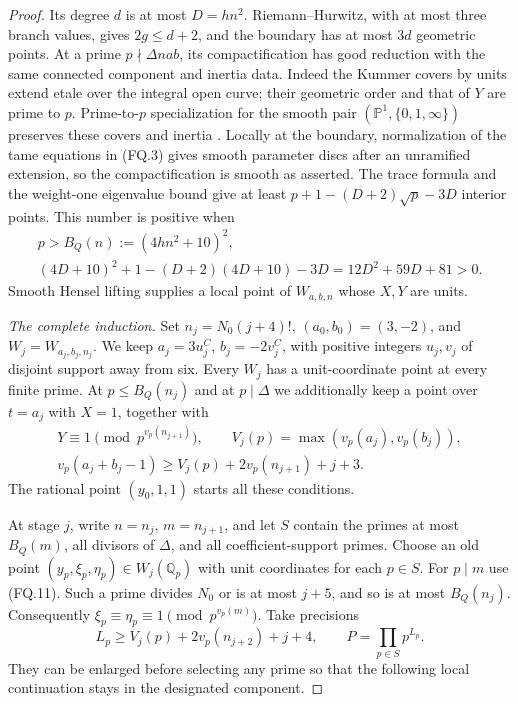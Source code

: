 \begin{proof}
Its degree \(d\) is at most \(D=hn^2\).
Riemann--Hurwitz, with at most three branch
values, gives \(2g\le d+2\), and the boundary
has at most \(3d\) geometric points.
At a prime \(p\nmid\Delta nab\), its
compactification has good reduction with the
same connected component and inertia data.
Indeed the Kummer covers by units extend
etale over the integral open curve; their
geometric order and that of \(Y\) are prime
to \(p\). Prime-to-\(p\) specialization for
the smooth pair \((\mathbb P^1,\{0,1,\infty\})\)
preserves these covers and inertia
\cite[Expos\'e XIII, Corollary 2.9,
\S2.10 and Lemma 2.11]{GhostSGA1}.
Locally at the boundary, normalization of the
tame equations in (FQ.3) gives smooth parameter
discs after an unramified extension, so the
compactification is smooth as asserted.
The trace formula and the weight-one eigenvalue
bound \cite[(1.5.1) and Theorem (1.6)]{GhostDeligneWeilI}
give at least
\(p+1-(D+2)\sqrt p-3D\) interior points.
This number is positive when
\[
 \begin{gathered}
 p>B_Q(n):=(4hn^2+10)^2,\\
 (4D+10)^2+1-(D+2)(4D+10)-3D
   =12D^2+59D+81>0.
 \end{gathered}
 \tag{FQ.10}
\]
Smooth Hensel lifting supplies a local point
of \(W_{a,b,n}\) whose \(X,Y\) are units.

\emph{The complete induction.}
Set \(n_j=N_0(j+4)!\), \((a_0,b_0)=(3,-2)\),
and \(W_j=W_{a_j,b_j,n_j}\).
We keep \(a_j=3u_j^C\), \(b_j=-2v_j^C\),
with positive integers \(u_j,v_j\) of disjoint
support away from six. Every \(W_j\) has a
unit-coordinate point at every finite prime.
At \(p\le B_Q(n_j)\) and at \(p\mid\Delta\)
we additionally keep a point over \(t=a_j\)
with \(X=1\), together with
\[
 \begin{gathered}
 Y\equiv1\pmod {p^{v_p(n_{j+1})}},\qquad
 V_j(p)=\max(v_p(a_j),v_p(b_j)),\\
 v_p(a_j+b_j-1)\ge
 V_j(p)+2v_p(n_{j+1})+j+3.
 \end{gathered}
 \tag{FQ.11}
\]
The rational point \((y_0,1,1)\) starts all
these conditions.

At stage \(j\), write \(n=n_j\), \(m=n_{j+1}\),
and let \(S\) contain the primes at most
\(B_Q(m)\), all divisors of \(\Delta\), and
all coefficient-support primes.
Choose an old point
\((y_p,\xi_p,\eta_p)\in W_j(\mathbb Q_p)\)
with unit coordinates for each \(p\in S\).
For \(p\mid m\) use (FQ.11).
Such a prime divides \(N_0\) or is at most
\(j+5\), and so is at most \(B_Q(n_j)\).
Consequently
\(\xi_p\equiv\eta_p\equiv1\pmod {p^{v_p(m)}}\).
Take precisions
\[
 L_p\ge V_j(p)+2v_p(n_{j+2})+j+4,
 \qquad P=\prod_{p\in S}p^{L_p}.
 \tag{FQ.12}
\]
They can be enlarged before selecting any prime
so that the following local continuation stays
in the designated component.


\end{proof}
